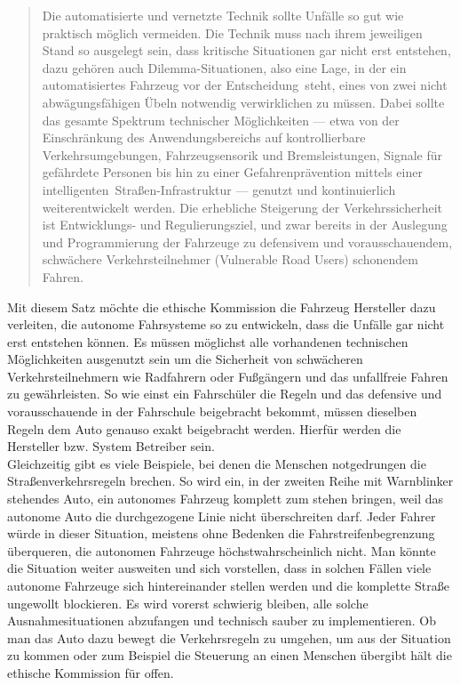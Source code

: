 \documentclass[twoside,a4paper,12pt]{article}
\begin{document}
\begin{quote}
\glqq
Die automatisierte und vernetzte Technik sollte Unfälle so gut wie praktisch möglich vermeiden. Die Technik muss nach 
ihrem jeweiligen Stand so ausgelegt sein, dass kritische
Situationen gar nicht erst entstehen, dazu gehören auch Dilemma-Situationen, also eine
Lage, in der ein automatisiertes Fahrzeug vor der \glqq Entscheidung\grqq\ steht, eines von zwei
nicht abwägungsfähigen Übeln notwendig verwirklichen zu müssen. Dabei sollte das gesamte Spektrum technischer 
Möglichkeiten --- etwa von der Einschränkung des Anwendungsbereichs auf kontrollierbare Verkehrsumgebungen, 
Fahrzeugsensorik und Bremsleistungen, Signale für gefährdete Personen bis hin zu einer Gefahrenprävention mittels
einer \glqq intelligenten\grqq\ Straßen-Infrastruktur --- genutzt und kontinuierlich weiterentwickelt
werden. Die erhebliche Steigerung der Verkehrssicherheit ist Entwicklungs- und Regulierungsziel, und zwar bereits in der 
Auslegung und Programmierung der Fahrzeuge zu defensivem und vorausschauendem, schwächere Verkehrsteilnehmer (\glqq Vulnerable Road
Users\grqq) schonendem Fahren.\grqq\mbox{~\cite[S. 10]{ek}}
\end{quote}
Mit diesem Satz möchte die ethische Kommission die Fahrzeug Hersteller dazu verleiten, die autonome Fahrsysteme so zu entwickeln, dass die Unfälle gar nicht erst entstehen können.  Es müssen möglichst alle vorhandenen technischen Möglichkeiten ausgenutzt sein um die Sicherheit von schwächeren Verkehrsteilnehmern wie Radfahrern oder Fußgängern und das unfallfreie Fahren zu gewährleisten. So wie einst ein Fahrschüler die Regeln und das defensive und vorausschauende in der Fahrschule beigebracht bekommt, müssen dieselben Regeln dem Auto genauso exakt beigebracht werden. Hierfür werden die Hersteller bzw. System Betreiber sein. \\ Gleichzeitig gibt es viele Beispiele, bei denen die Menschen notgedrungen die Straßenverkehrsregeln brechen. So wird ein, in der zweiten Reihe mit Warnblinker stehendes Auto, ein autonomes Fahrzeug komplett zum stehen bringen, weil das autonome Auto die durchgezogene Linie nicht überschreiten darf. \cite{zeit1} Jeder Fahrer würde in dieser Situation, meistens ohne Bedenken die Fahrstreifenbegrenzung überqueren, die autonomen Fahrzeuge höchstwahrscheinlich nicht. Man könnte die Situation weiter ausweiten und sich vorstellen, dass in solchen Fällen viele autonome Fahrzeuge sich hintereinander stellen werden und die komplette Straße ungewollt blockieren. Es wird vorerst schwierig bleiben, alle solche Ausnahmesituationen abzufangen und technisch sauber zu implementieren.  Ob man das Auto dazu bewegt die Verkehrsregeln zu umgehen, um aus der Situation zu kommen oder zum Beispiel die Steuerung an einen Menschen übergibt hält die ethische Kommission für offen. 
\end{document}
